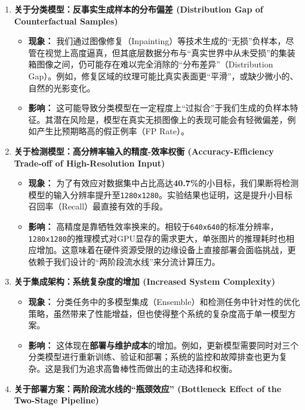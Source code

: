\documentclass[
]{article}
\begin{document}
\begin{enumerate}
\def\labelenumi{\arabic{enumi}.}
\item
  \textbf{关于分类模型：反事实生成样本的分布偏差 (Distribution Gap of
  Counterfactual Samples)}

  \begin{itemize}
  \item
    \textbf{现象：}
    我们通过图像修复（Inpainting）等技术生成的``无损''负样本，尽管在视觉上高度逼真，但其底层数据分布与``真实世界中从未受损''的集装箱图像之间，仍可能存在难以完全消除的``分布差异''（Distribution
    Gap）。例如，修复区域的纹理可能比真实表面更``平滑''，或缺少微小的、自然的光影变化。
  \item
    \textbf{影响：}
    这可能导致分类模型在一定程度上``过拟合''于我们生成的负样本特征。其潜在风险是，模型在真实无损图像上的表现可能会有轻微偏差，例如产生比预期略高的假正例率（FP
    Rate）。
  \end{itemize}
\item
  \textbf{关于检测模型：高分辨率输入的精度-效率权衡 (Accuracy-Efficiency
  Trade-off of High-Resolution Input)}

  \begin{itemize}
  \item
    \textbf{现象：}
    为了有效应对数据集中占比高达\textbf{40.7\%}的小目标，我们果断将检测模型的输入分辨率提升至\texttt{1280x1280}。实验结果也证明，这是提升小目标召回率（Recall）最直接有效的手段。
  \item
    \textbf{影响：}
    高精度是靠牺牲效率换来的。相较于\texttt{640x640}的标准分辨率，\texttt{1280x1280}的推理模式对GPU显存的需求更大，单张图片的推理耗时也相应增加。这意味着在硬件资源受限的边缘设备上直接部署会面临挑战，更依赖于我们设计的``两阶段流水线''来分流计算压力。
  \end{itemize}
\item
  \textbf{关于集成架构：系统复杂度的增加 (Increased System Complexity)}

  \begin{itemize}
  \item
    \textbf{现象：}
    分类任务中的多模型集成（Ensemble）和检测任务中针对性的优化策略，虽然带来了性能增益，但也使得整个系统的复杂度高于单一模型方案。
  \item
    \textbf{影响：}
    这体现在\textbf{部署与维护成本}的增加。例如，更新模型需要同时对三个分类模型进行重新训练、验证和部署；系统的监控和故障排查也更为复杂。这是我们为追求高鲁棒性而做出的主动选择和权衡。
  \end{itemize}
\item
  \textbf{关于部署方案：两阶段流水线的``瓶颈效应'' (Bottleneck Effect of
  the Two-Stage Pipeline)}


\end{enumerate}
\end{document}
